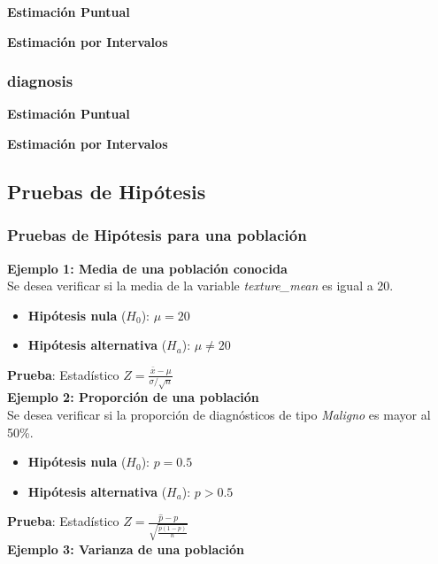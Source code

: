 \documentclass[a4paper, 12pt]{article}
\begin{document}
\textbf{Estimación Puntual}

\textbf{Estimación por Intervalos}


\subsubsection{diagnosis}

\textbf{Estimación Puntual}

\textbf{Estimación por Intervalos}


\subsection{Pruebas de Hipótesis}

\subsubsection{Pruebas de Hipótesis para una población}

\textbf{Ejemplo 1: Media de una población conocida}\\

Se desea verificar si la media de la variable \textit{texture\_mean} es igual a 20. 

\begin{itemize}
	\item \textbf{Hipótesis nula} (\(H_0\)): \(\mu = 20\)
	\item \textbf{Hipótesis alternativa} (\(H_a\)): \(\mu \neq 20\)
\end{itemize}

\textbf{Prueba}: Estadístico \( Z = \frac{\bar{x} - \mu}{\sigma / \sqrt{n}} \)\\

\textbf{Ejemplo 2: Proporción de una población}\\

Se desea verificar si la proporción de diagnósticos de tipo \textit{Maligno} es mayor al 50\%.

\begin{itemize}
	\item \textbf{Hipótesis nula} (\(H_0\)): \(p = 0.5\)
	\item \textbf{Hipótesis alternativa} (\(H_a\)): \(p > 0.5\)
\end{itemize}

\textbf{Prueba}: Estadístico \( Z = \frac{\hat{p} - p}{\sqrt{\frac{p(1-p)}{n}}} \)\\

\textbf{Ejemplo 3: Varianza de una población}\\
\end{document}
